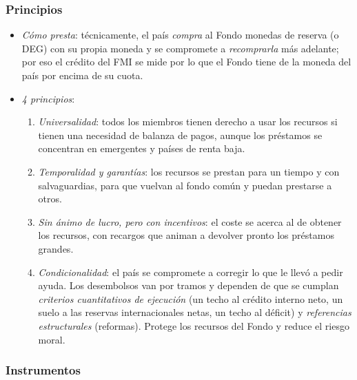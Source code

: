 \documentclass[11pt]{article}
\begin{document}
\subsubsection{Principios}\label{sec:principios}

\begin{itemize}
\item \emph{Cómo presta}: técnicamente, el país \emph{compra} al Fondo monedas de reserva (o DEG) con su propia moneda y se compromete a \emph{recomprarla} más adelante; por eso el crédito del FMI se mide por lo que el Fondo tiene de la moneda del país por encima de su cuota.
\item \emph{4 principios}:
  \begin{enumerate}
  \item \emph{Universalidad}: todos los miembros tienen derecho a usar los recursos si tienen una necesidad de balanza de pagos, aunque los préstamos se concentran en emergentes y países de renta baja.
  \item \emph{Temporalidad y garantías}: los recursos se prestan para un tiempo y con salvaguardias, para que vuelvan al fondo común y puedan prestarse a otros.
  \item \emph{Sin ánimo de lucro, pero con incentivos}: el coste se acerca al de obtener los recursos, con recargos que animan a devolver pronto los préstamos grandes.
  \item \emph{Condicionalidad}: el país se compromete a corregir lo que le llevó a pedir ayuda. Los desembolsos van por tramos y dependen de que se cumplan \emph{criterios cuantitativos de ejecución} (un techo al crédito interno neto, un suelo a las reservas internacionales netas, un techo al déficit) y \emph{referencias estructurales} (reformas). Protege los recursos del Fondo y reduce el riesgo moral\nocite{FMI2025Condicionalidad}.
  \end{enumerate}
\end{itemize}

\subsubsection{Instrumentos}\label{sec:instrumentos}
\end{document}
